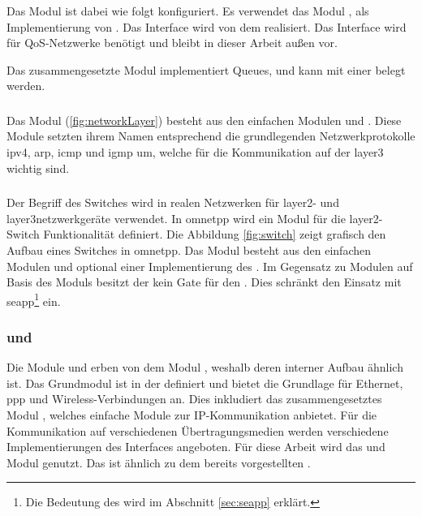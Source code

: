 Das  Modul ist dabei wie folgt konfiguriert. Es verwendet das Modul , als Implementierung von . Das Interface  wird von dem  realisiert. Das Interface  wird für QoS-Netzwerke benötigt und bleibt in dieser Arbeit außen vor. 

Das zusammengesetzte Modul  implementiert Queues, und kann mit einer  belegt werden.

\subsubsection{}
Das Modul  (\ref{fig:networkLayer}) besteht aus den einfachen Modulen  und . Diese Module setzten ihrem Namen entsprechend die grundlegenden Netzwerkprotokolle \gls{ipv4}, \gls{arp}, \gls{icmp} und \gls{igmp} um, welche für die Kommunikation auf der \gls{layer3} wichtig sind.


\subsubsection{}
Der Begriff des Switches wird in realen Netzwerken für \gls{layer2}- und \gls{layer3}netzwerkgeräte verwendet. In \gls{omnetpp} wird ein Modul für die \gls{layer2}-Switch Funktionalität definiert. Die Abbildung \ref{fig:switch} zeigt grafisch den Aufbau eines Switches in \gls{omnetpp}. Das Modul besteht aus den einfachen Modulen  und optional einer Implementierung des . Im Gegensatz zu Modulen auf Basis des Moduls  besitzt der  kein Gate für den . Dies schränkt den Einsatz mit \gls{seapp}\footnote{Die Bedeutung des  wird im Abschnitt \ref{sec:seapp} erklärt.} ein.



\subsubsection{ und }
Die Module  und  erben von dem Modul , weshalb deren interner Aufbau ähnlich ist. Das Grundmodul  ist in der  definiert und bietet die Grundlage für Ethernet, \gls{ppp} und Wireless-Verbindungen an. Dies inkludiert das zusammengesetztes Modul , welches einfache Module zur IP-Kommunikation anbietet. Für die Kommunikation auf verschiedenen Übertragungsmedien werden verschiedene Implementierungen des  Interfaces angeboten. Für diese Arbeit wird das  und  Modul genutzt. Das  ist ähnlich zu dem bereits vorgestellten .


